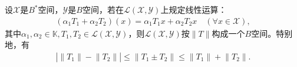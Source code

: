 \documentclass[../../main.tex]{subfiles}%
\begin{document}
\begin{theorem}\label{theorem:有界线性算子全体构成的空间完备}
设$\mathscr{X}$是$B^*$空间，$\mathscr{Y}$是$B$空间，若在$\mathscr{L}(\mathscr{X},\mathscr{Y})$上规定线性运算：
\begin{align*}
(\alpha_1T_1+\alpha_2T_2)(x)=\alpha_1T_1x+\alpha_2T_2x\quad (\forall x\in\mathscr{X}),
\end{align*}
其中$\alpha_1,\alpha_2\in\mathbb{K},T_1,T_2\in\mathscr{L}(\mathscr{X},\mathscr{Y})$，则$\mathscr{L}(\mathscr{X},\mathscr{Y})$按$\|T\|$构成一个$B$空间。特别地，有
\begin{align*}
\left| \left\| T_1 \right\| -\left\| T_2 \right\| \right|\leqslant \left\| T_1\pm T_2 \right\| \leqslant \left\| T_1 \right\| +\left\| T_2 \right\| .
\end{align*}
\end{theorem}
\end{document}

